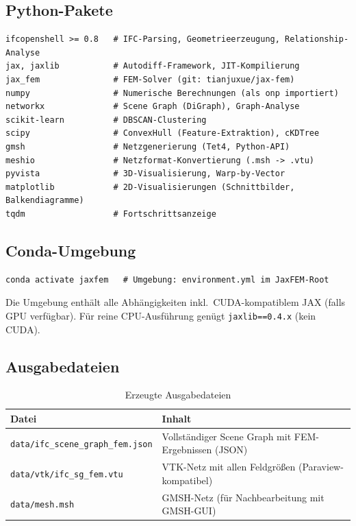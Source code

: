 \documentclass[a4paper,11pt]{article}
\begin{document}
\subsection{Python-Pakete}

\begin{lstlisting}[style=plain, numbers=none]
ifcopenshell >= 0.8   # IFC-Parsing, Geometrieerzeugung, Relationship-Analyse
jax, jaxlib           # Autodiff-Framework, JIT-Kompilierung
jax_fem               # FEM-Solver (git: tianjuxue/jax-fem)
numpy                 # Numerische Berechnungen (als onp importiert)
networkx              # Scene Graph (DiGraph), Graph-Analyse
scikit-learn          # DBSCAN-Clustering
scipy                 # ConvexHull (Feature-Extraktion), cKDTree
gmsh                  # Netzgenerierung (Tet4, Python-API)
meshio                # Netzformat-Konvertierung (.msh -> .vtu)
pyvista               # 3D-Visualisierung, Warp-by-Vector
matplotlib            # 2D-Visualisierungen (Schnittbilder, Balkendiagramme)
tqdm                  # Fortschrittsanzeige
\end{lstlisting}

\subsection{Conda-Umgebung}

\begin{lstlisting}[style=plain, numbers=none]
conda activate jaxfem   # Umgebung: environment.yml im JaxFEM-Root
\end{lstlisting}

Die Umgebung enthält alle Abhängigkeiten inkl.\ CUDA-kompatiblem JAX (falls GPU verfügbar). Für reine CPU-Ausführung genügt \texttt{jaxlib==0.4.x} (kein CUDA).

\subsection{Ausgabedateien}

\begin{table}[H]
\centering
\caption{Erzeugte Ausgabedateien}
\begin{tabular}{ll}
\toprule
\textbf{Datei} & \textbf{Inhalt} \\
\midrule
\texttt{data/ifc\_scene\_graph\_fem.json} & Vollständiger Scene Graph mit FEM-Ergebnissen (JSON) \\
\texttt{data/vtk/ifc\_sg\_fem.vtu} & VTK-Netz mit allen Feldgrößen (Paraview-kompatibel) \\
\texttt{data/mesh.msh} & GMSH-Netz (für Nachbearbeitung mit GMSH-GUI) \\
\bottomrule
\end{tabular}
\end{table}
\end{document}
